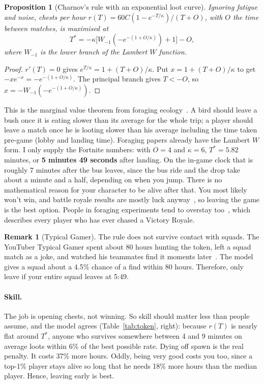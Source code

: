 \documentclass[11pt]{article}
\theoremstyle{definition}
\newtheorem{remark}[definition]{Remark}
\theoremstyle{plain}
\newtheorem{proposition}[definition]{Proposition}
\begin{document}
\begin{proposition}[Charnov's rule with an exponential loot curve]
Ignoring fatigue and noise, chests per hour $r(T) = 60C(1 - e^{-T/\kappa})/(T + O)$, with $O$ the time between matches, is maximised at
\[
T^* = -\kappa\big[W_{-1}(-e^{-(1+O/\kappa)}) + 1\big] - O,
\]
where $W_{-1}$ is the lower branch of the Lambert $W$ function.
\end{proposition}

\begin{proof}
$r'(T)=0$ gives $e^{T/\kappa} = 1 + (T+O)/\kappa$. Put $x = 1 + (T+O)/\kappa$ to get $-xe^{-x} = -e^{-(1+O/\kappa)}$. The principal branch gives $T<-O$, so $x = -W_{-1}(-e^{-(1+O/\kappa)})$.
\end{proof}

This is the marginal value theorem from foraging ecology~\cite{charnov}. A bird should leave a bush once it is eating slower than its average for the whole trip; a player should leave a match once he is looting slower than his average including the time taken pre-game (lobby and landing time). Foraging papers already have the Lambert $W$ form. I only supply the Fortnite numbers: with $O = 4$ and $\kappa = 6$, $T^* = 5.82$ minutes, or \textbf{5 minutes 49 seconds} after landing. On the in-game clock that is roughly 7 minutes after the bus leaves, since the bus ride and the drop take about a minute and a half, depending on when you jump. There is no mathematical reason for your character to be alive after that. You most likely won't win, and battle royale results are mostly luck anyway~\cite{rosenbusch}, so leaving the game is the best option. People in foraging experiments tend to overstay too~\cite{saravanakumar}, which describes every player who has ever chased a Victory Royale.

\begin{remark}[Typical Gamer]\label{rem:tg}
The rule does not survive contact with squads. The YouTuber Typical Gamer spent about 80 hours hunting the token, left a squad match as a joke, and watched his teammates find it moments later~\cite{dexerto}. The model gives a squad about a 4.5\% chance of a find within 80 hours. Therefore, only leave if your entire squad leaves at 5:49.
\end{remark}

\paragraph{Skill.} The job is opening chests, not winning. So skill should matter less than people assume, and the model agrees (Table~\ref{tab:token}, right): because $r(T)$ is nearly flat around $T^*$, anyone who survives somewhere between 4 and 9 minutes on average loots within 6\% of the best possible rate. Dying off spawn is the real penalty. It costs 37\% more hours. Oddly, being very good costs you too, since a top-1\% player stays alive so long that he needs 18\% more hours than the median player. Hence, leaving early is best.
\end{document}
